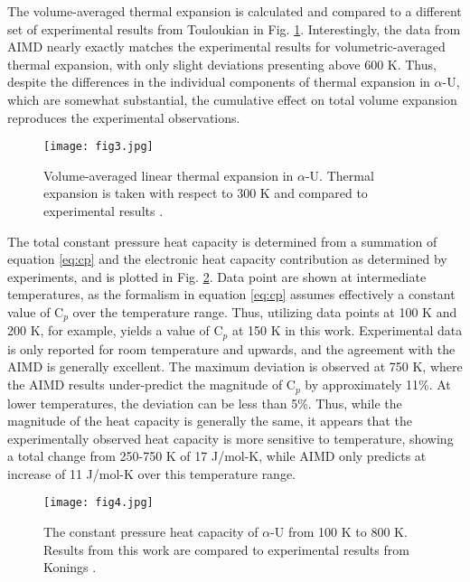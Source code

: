 \documentclass[utf8]{frontiersSCNS} %
\begin{document}
\FloatBarrier

The volume-averaged thermal expansion is calculated and compared to a different set of experimental results from Touloukian \cite{touloukian} in Fig. \ref{fig:vol}. Interestingly, the data from AIMD nearly exactly matches the experimental results for volumetric-averaged thermal expansion, with only slight deviations presenting above 600 K. Thus, despite the differences in the individual components of thermal expansion in $\alpha$-U, which are somewhat substantial, the cumulative effect on total volume expansion reproduces the experimental observations. 

 \begin{figure}[hbt]
	\centering
	\texttt{[image: fig3.jpg]}
    \caption{Volume-averaged linear thermal expansion in $\alpha$-U. Thermal expansion is taken with respect to 300 K and compared to experimental results \cite{touloukian}.}\label{fig:vol}
\end{figure}

The total constant pressure heat capacity is determined from a summation of equation \ref{eq:cp} and the electronic heat capacity contribution as determined by experiments, and is plotted in Fig. \ref{fig:cp}. Data point are shown at intermediate temperatures, as the formalism in equation \ref{eq:cp} assumes effectively a constant value of C$_p$ over the temperature range. Thus, utilizing data points at 100 K and 200 K, for example, yields a value of C$_p$ at 150 K in this work. Experimental data is only reported for room temperature and upwards, and the agreement with the AIMD is generally excellent. The maximum deviation is observed at 750 K, where the AIMD results under-predict the magnitude of C$_p$ by approximately 11\%. At lower temperatures, the deviation can be less than 5\%. Thus, while the magnitude of the heat capacity is generally the same, it appears that the experimentally observed heat capacity is more sensitive to temperature, showing a total change from 250-750 K of 17 J/mol-K, while AIMD only predicts at increase of 11 J/mol-K over this temperature range. 

 \begin{figure}[hbt]
	\centering
	\texttt{[image: fig4.jpg]}
    \caption{The constant pressure heat capacity of $\alpha$-U from 100 K to 800 K. Results from this work are compared to experimental results from Konings \cite{konings2010}.}\label{fig:cp}
\end{figure}
\end{document}
